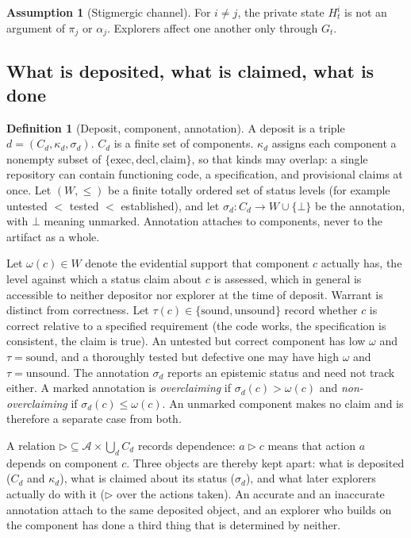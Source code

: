 \documentclass[11pt]{article}
\theoremstyle{definition}
\newtheorem{definition}[proposition]{Definition}
\newtheorem{assumption}[proposition]{Assumption}
\theoremstyle{remark}
\begin{document}
\begin{assumption}[Stigmergic channel]\label{ass:channel}
For $i\neq j$, the private state $H_t^i$ is not an argument of $\pi_j$ or $\alpha_j$. Explorers affect one another only through $G_t$.
\end{assumption}

\subsection{What is deposited, what is claimed, what is done}

\begin{definition}[Deposit, component, annotation]\label{def:deposit}
A deposit is a triple $d=(C_d,\kappa_d,\sigma_d)$. $C_d$ is a finite set of components. $\kappa_d$ assigns each component a nonempty subset of $\{\mathrm{exec},\mathrm{decl},\mathrm{claim}\}$, so that kinds may overlap: a single repository can contain functioning code, a specification, and provisional claims at once. Let $(W,\le)$ be a finite totally ordered set of status levels (for example untested $<$ tested $<$ established), and let $\sigma_d:C_d\to W\cup\{\bot\}$ be the annotation, with $\bot$ meaning unmarked. Annotation attaches to components, never to the artifact as a whole.
\end{definition}

Let $\omega(c)\in W$ denote the evidential support that component $c$ actually has, the level against which a status claim about $c$ is assessed, which in general is accessible to neither depositor nor explorer at the time of deposit. Warrant is distinct from correctness. Let $\tau(c)\in\{\mathrm{sound},\mathrm{unsound}\}$ record whether $c$ is correct relative to a specified requirement (the code works, the specification is consistent, the claim is true). An untested but correct component has low $\omega$ and $\tau=\mathrm{sound}$, and a thoroughly tested but defective one may have high $\omega$ and $\tau=\mathrm{unsound}$. The annotation $\sigma_d$ reports an epistemic status and need not track either. A marked annotation is \emph{overclaiming} if $\sigma_d(c)>\omega(c)$ and \emph{non-overclaiming} if $\sigma_d(c)\le\omega(c)$. An unmarked component makes no claim and is therefore a separate case from both.

A relation $\rhd\subseteq\mathcal{A}\times\bigcup_d C_d$ records dependence: $a\rhd c$ means that action $a$ depends on component $c$. Three objects are thereby kept apart: what is deposited ($C_d$ and $\kappa_d$), what is claimed about its status ($\sigma_d$), and what later explorers actually do with it ($\rhd$ over the actions taken). An accurate and an inaccurate annotation attach to the same deposited object, and an explorer who builds on the component has done a third thing that is determined by neither.
\end{document}
